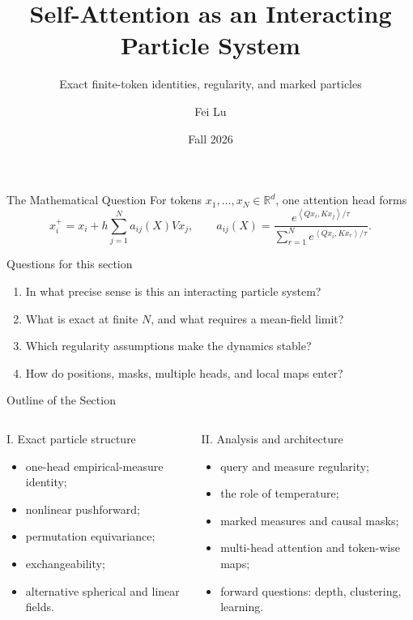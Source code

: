 \documentclass[aspectratio=169,11pt]{beamer}
\title{Self-Attention as an Interacting Particle System}
\subtitle{Exact finite-token identities, regularity, and marked particles}
\author{Fei Lu}
\date{Fall 2026}
\newcommand{\R}{\mathbb{R}}
\newcommand{\ip}[2]{\left\langle#1,#2\right\rangle}
\begin{document}
\begin{frame}
  \titlepage
\end{frame}

\begin{frame}{The Mathematical Question}
For tokens $x_1,\ldots,x_N\in\R^d$, one attention head forms
\[
  x_i^+=x_i+h\sum_{j=1}^N a_{ij}(X)Vx_j,
  \qquad
  a_{ij}(X)=
  \frac{e^{\ip{Qx_i}{Kx_j}/\tau}}
       {\sum_{r=1}^Ne^{\ip{Qx_i}{Kx_r}/\tau}}.
\]

\begin{block}{Questions for this section}
\begin{enumerate}
\item In what precise sense is this an interacting particle system?
\item What is exact at finite $N$, and what requires a mean-field limit?
\item Which regularity assumptions make the dynamics stable?
\item How do positions, masks, multiple heads, and local maps enter?
\end{enumerate}
\end{block}
\end{frame}

\begin{frame}{Outline of the Section}
\begin{columns}[T,onlytextwidth]
\begin{block}{I. Exact particle structure}
\begin{itemize}
\item one-head empirical-measure identity;
\item nonlinear pushforward;
\item permutation equivariance;
\item exchangeability;
\item alternative spherical and linear fields.
\end{itemize}
\end{block}

\begin{exampleblock}{II. Analysis and architecture}
\begin{itemize}
\item query and measure regularity;
\item the role of temperature;
\item marked measures and causal masks;
\item multi-head attention and token-wise maps;
\item forward questions: depth, clustering, learning.
\end{itemize}
\end{exampleblock}
\end{columns}
\end{frame}
\end{document}
